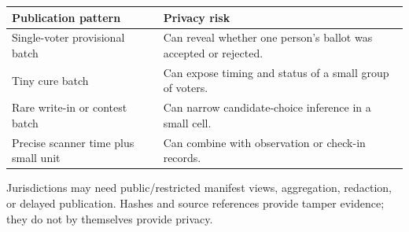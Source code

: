 \begin{center}
\small
\begin{tabularx}{\textwidth}{lX}
\toprule
Publication pattern & Privacy risk \\
\midrule
Single-voter provisional batch & Can reveal whether one person's ballot was accepted or rejected. \\
Tiny cure batch & Can expose timing and status of a small group of voters. \\
Rare write-in or contest batch & Can narrow candidate-choice inference in a small cell. \\
Precise scanner time plus small unit & Can combine with observation or check-in records. \\
\bottomrule
\end{tabularx}
\end{center}

Jurisdictions may need public/restricted manifest views, aggregation, redaction,
or delayed publication. Hashes and source references provide tamper evidence;
they do not by themselves provide privacy.
